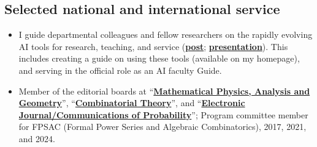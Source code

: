 \documentclass[letterpaper,11pt]{article}
\begin{document}
\subsection*{Selected national and international service}

\begin{itemize}
	\item 
		I guide departmental colleagues and fellow
		researchers on the rapidly
		evolving AI tools for research, teaching, and service
		(\href{https://lpetrov.cc/AI-math/}{\textbf{post}};
		\href{https://storage.lpetrov.cc/research_files/talks/AI_UVA_Oct10.pdf}{\textbf{presentation}}).
		This includes creating a guide on using these tools
		(available on my homepage), and serving in the official
		role as an AI faculty Guide.
	\item
	Member of the editorial boards at ``\href{https://www.springer.com/journal/11040}{\textbf{Mathematical Physics, Analysis and Geometry}}'', ``\href{https://escholarship.org/uc/combinatorial_theory/}{\textbf{Combinatorial Theory}}'', and ``\href{https://imstat.org/journals-and-publications/electronic-journal-of-probability/}{\textbf{Electronic Journal/Communications of Probability}}'';
	Program committee member for FPSAC (Formal Power Series and Algebraic Combinatorics),
		2017, 2021, and 2024.
\end{itemize}
\end{document}
